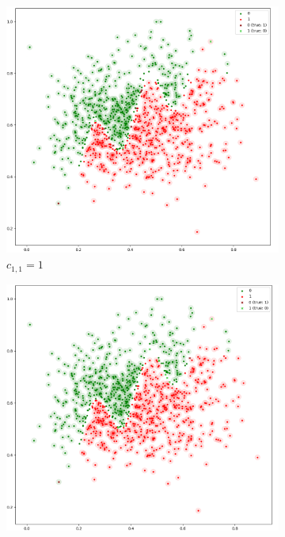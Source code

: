 \documentclass[acmsmall,nonacm]{acmart}
\begin{document}
\begin{figure}[H]
  \begin{subfigure}[b]{0.32\textwidth}
      \includegraphics[width=\textwidth]{assets/b-val-cost1-eps0_01}
      \caption{$c_{1, 1} = 1$}
    \end{subfigure}
  \begin{subfigure}[b]{0.32\textwidth}
      \includegraphics[width=\textwidth]{assets/b-val-cost10-eps0_01}

\end{subfigure}
\end{figure}
\end{document}

